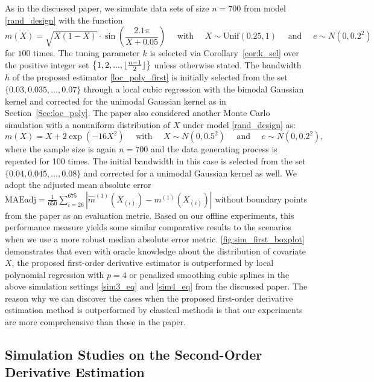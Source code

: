 \documentclass{uwstat572}
\theoremstyle{definition}
\DeclarePairedDelimiter\floor{\lfloor}{\rfloor}
\renewcommand{\hat}{\widehat}
\theoremstyle{theorem}
\begin{document}
As in the discussed paper, we simulate data sets of size $n=700$ from model \eqref{rand_design} with the function
\begin{equation}
\label{sim3_eq}
m(X) = \sqrt{X(1-X)} \cdot\sin\left(\frac{2.1\pi}{X+0.05}\right) \quad \text{ with } \quad X\sim \mathrm{Unif}(0.25,1) \quad \text{ and } \quad e\sim N(0,0.2^2)
\end{equation}
for $100$ times. The tuning parameter $k$ is selected via Corollary~\ref{cor:k_sel} over the positive integer set $\left\{1,2,...,\floor{\frac{n-1}{2}}\right\}$ unless otherwise stated. The bandwidth $h$ of the proposed estimator \eqref{loc_poly_first} is initially selected from the set $\{0.03, 0.035,...,0.07\}$ through a local cubic regression with the bimodal Gaussian kernel and corrected for the unimodal Gaussian kernel as in Section~\ref{Sec:loc_poly}. The paper also considered another Monte Carlo simulation with a nonuniform distribution of $X$ under model \eqref{rand_design} as:
\begin{equation}
	\label{sim4_eq}
	m(X) = X+ 2\exp\left(-16X^2\right) \quad \text{ with } \quad X\sim N(0,0.5^2) \quad \text{ and } \quad e\sim N(0,0.2^2),
\end{equation}
where the sample size is again $n=700$ and the data generating process is repeated for 100 times. The initial bandwidth in this case is selected from the set $\{0.04, 0.045,...,0.08\}$ and corrected for a unimodal Gaussian kernel as well. We adopt the adjusted mean absolute error $\text{MAEadj}=\frac{1}{650}\sum_{i=26}^{675} \left|\hat{m}^{(1)}(X_{(i)}) -m^{(1)}(X_{(i)}) \right|$ without boundary points from the paper as an evaluation metric. Based on our offline experiments, this performance measure yields some similar comparative results to the scenarios when we use a more robust median absolute error metric. \autoref{fig:sim_first_boxplot} demonstrates that even with oracle knowledge about the distribution of covariate $X$, the proposed first-order derivative estimator is outperformed by local polynomial regression with $p=4$ or penalized smoothing cubic splines in the above simulation settings \eqref{sim3_eq} and \eqref{sim4_eq} from the discussed paper. The reason why we can discover the cases when the proposed first-order derivative estimation method is outperformed by classical methods is that our experiments are more comprehensive than those in the paper.


\subsection{Simulation Studies on the Second-Order Derivative Estimation}
\label{Sec:sim_second_order}
\end{document}
